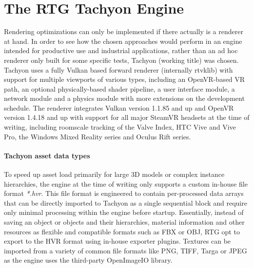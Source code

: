 
\chapter{The \gls{RTG} \gls{Tachyon} Engine} \label{Tachyon}
Rendering optimizations can only be implemented if there actually is a renderer at hand. In order to see how the chosen approaches would perform in an engine intended for productive use and industrial applications, rather than an ad hoc renderer only built for some specific tests, \gls{Tachyon} (working title) was chosen. \gls{Tachyon} uses a fully Vulkan based forward renderer (internally \gls{rtvklib}) with support for multiple viewports of various types, including an \gls{OpenVR}-based \gls{VR} path, an optional physically-based shader pipeline, a user interface module, a network module and a physics module with more extensions on the development schedule. The renderer integrates Vulkan version 1.1.85 and up and \gls{OpenVR} version 1.4.18 and up with support for all major SteamVR headsets at the time of writing, including roomscale tracking of the Valve Index, HTC Vive and Vive Pro, the Windows Mixed Reality series and Oculus Rift series. 

\subsubsection{\gls{Tachyon} asset data types}
To speed up asset load primarily for large 3D models or complex instance hierarchies, the engine at the time of writing only supports a custom in-house file format \textit{*.hvr}. This file format is engineered to contain per-processed data arrays that can be directly imported to \gls{Tachyon} as a single sequential block and require only minimal processing within the engine before startup. Essentially, instead of saving an object or objects and their hierarchies, material information and other resources as flexible and compatible formats such as FBX or OBJ, \gls{RTG} opt to export to the HVR format using in-house exporter plugins. Textures can be imported from a variety of common file formats like PNG, TIFF, Targa or JPEG as the engine uses the third-party OpenImageIO \cite{Gritz.2019} library. 

